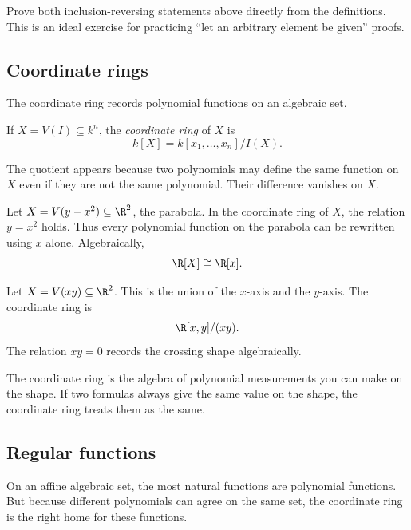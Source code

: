 \begin{labbox}
Prove both inclusion-reversing statements above directly from the definitions.
This is an ideal exercise for practicing ``let an arbitrary element be given''
proofs.
\end{labbox}

\subsection{Coordinate rings}

The coordinate ring records polynomial functions on an algebraic set.

\begin{definition}
If $X=V(I)\subseteq k^n$, the \emph{coordinate ring} of $X$ is
\[
k[X]=k[x_1,\ldots,x_n]/I(X).
\]
\end{definition}

The quotient appears because two polynomials may define the same function on
$X$ even if they are not the same polynomial. Their difference vanishes on $X$.

\begin{example}
Let $X=V(y-x^2)\subseteq\R^2$, the parabola. In the coordinate ring of $X$, the
relation $y=x^2$ holds. Thus every polynomial function on the parabola can be
rewritten using $x$ alone. Algebraically,
\[
\R[X]\cong \R[x].
\]
\end{example}

\begin{example}
Let $X=V(xy)\subseteq\R^2$. This is the union of the $x$-axis and the $y$-axis.
The coordinate ring is
\[
\R[x,y]/(xy).
\]
The relation $xy=0$ records the crossing shape algebraically.
\end{example}

\begin{intuitionbox}
The coordinate ring is the algebra of polynomial measurements you can make on
the shape. If two formulas always give the same value on the shape, the
coordinate ring treats them as the same.
\end{intuitionbox}

\subsection{Regular functions}

On an affine algebraic set, the most natural functions are polynomial functions.
But because different polynomials can agree on the same set, the coordinate
ring is the right home for these functions.

